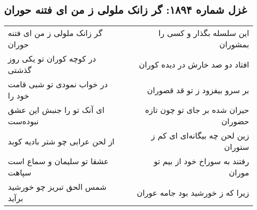 \begin{center}
\section*{غزل شماره ۱۸۹۴: گر زانک ملولی ز من ای فتنه حوران}
\label{sec:1894}
\begin{longtable}{l p{0.5cm} r}
گر زانک ملولی ز من ای فتنه حوران
&&
این سلسله بگذار و کسی را بمشوران
\\
در کوچه کوران تو یکی روز گذشتی
&&
افتاد دو صد خارش در دیده کوران
\\
در خواب نمودی تو شبی قامت خود را
&&
بر سرو بیفزود ز تو قد قصوران
\\
ای آنک تو را جنبش این عشق نبوده‌ست
&&
حیران شده بر جای تو چون تازه حضوران
\\
از لحن عرابی چو شتر بادیه کوبد
&&
زین لحن چه بیگانه‌ای ای کم ز ستوران
\\
عشقا تو سلیمان و سماع است سپاهت
&&
رفتند به سوراخ خود از بیم تو موران
\\
شمس الحق تبریز چو خورشید برآید
&&
زیرا که ز خورشید بود جامه عوران
\\
\end{longtable}
\end{center}
